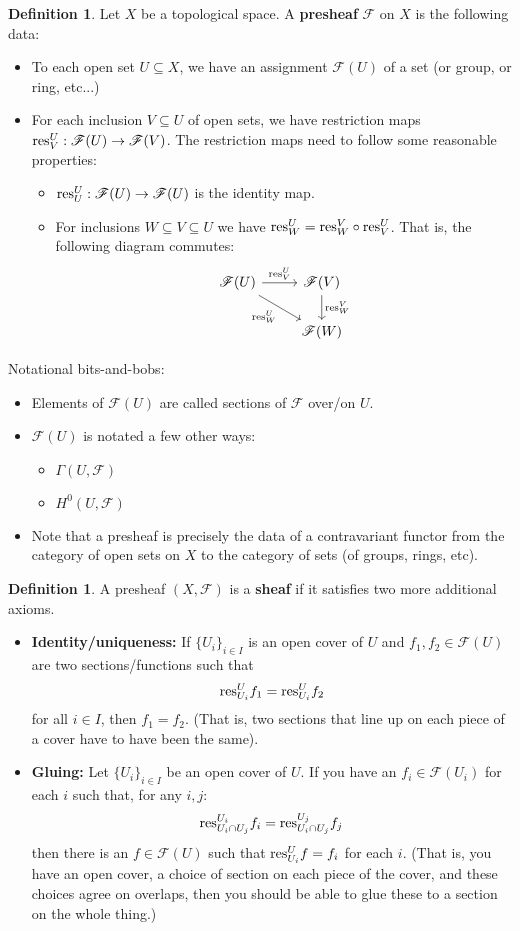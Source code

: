 \documentclass[10pt,reqno]{amsart}
\theoremstyle{definition}
\newtheorem{definition}[theorem]{Definition}
\theoremstyle{remark}
\numberwithin{equation}{section}
\numberwithin{theorem}{section}
\newcommand{\res}{\textup{res}}
\newcommand{\FF}{{\mathscr F}}
\begin{document}
\begin{definition} Let $X$ be a topological space. A \textbf{presheaf} $\FF$ on $X$ is the following data:
\begin{itemize}
\item To each open set $U \subseteq X$, we have an assignment $\FF(U)$ of a set (or group, or ring, etc...)
\item For each inclusion $V \subseteq U$ of open sets, we have restriction maps $\res^U_V: \FF(U) \to \FF(V)$. The restriction maps need to follow some reasonable properties:
\begin{itemize}
\item $\res^U_U: \FF(U) \to \FF(U)$ is the identity map.
\item For inclusions $W \subseteq V \subseteq U$ we have $\res^U_W = \res^V_W \circ \res^U_V$. That is, the following diagram commutes:
\[\begin{tikzcd}
\FF(U) \arrow[r,  "\res^U_V"] \arrow[dr, swap, "\res^U_W"]& \FF(V) \arrow[d, "\res^V_W"]\\
& \FF(W)
\end{tikzcd}\]
\end{itemize}
\end{itemize}
\end{definition}
Notational bits-and-bobs:
\begin{itemize}
\item Elements of $\FF(U)$ are called sections of $\FF$ over/on $U$.
\item $\FF(U)$ is notated a few other ways:
\begin{itemize}
\item $\Gamma(U, \FF)$
\item $H^0(U,\FF)$
\end{itemize}
\item Note that a presheaf is precisely the data of a contravariant functor from the category of open sets on $X$ to the category of sets (of groups, rings, etc).
\end{itemize}

\begin{definition} A presheaf $(X,\FF)$ is a \textbf{sheaf} if it satisfies two more additional axioms.
\begin{itemize}
\item \textbf{Identity/uniqueness:} If $\{U_i\}_{i \in I}$ is an open cover of $U$ and $f_1,f_2 \in \FF(U)$ are two sections/functions such that
\[\res^U_{U_i} f_1 = \res^U_{U_i} f_2\]
for all $i \in I$, then $f_1 = f_2$. (That is, two sections that line up on each piece of a cover have to have been the same).
\item \textbf{Gluing:} Let $\{U_i\}_{i \in I}$ be an open cover of $U$. If you have an $f_i \in \FF(U_i)$ for each $i$ such that, for any $i,j$:
\[\res^{U_i}_{U_i \cap U_j}f_i = \res^{U_j}_{U_i \cap U_j}f_j\]
then there is an $f \in \FF(U)$ such that $\res^U_{U_i} f = f_i$ for each $i$. (That is, you have an open cover, a choice of section on each piece of the cover, and these choices agree on overlaps, then you should be able to glue these to a section on the whole thing.)
\end{itemize}
\end{definition}
\end{document}
